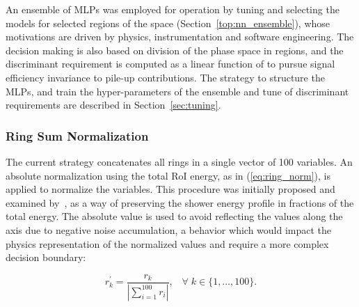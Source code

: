 An ensemble of MLPs was employed for operation by tuning and selecting
the models for selected regions of the \eteta space (Section~\ref{top:nn_ensemble}), whose
motivations are driven by physics, instrumentation and software 
engineering. The \rnn
decision making is also based on division of the phase space in regions, and the discriminant requirement is
computed as a linear function of \avgmu to pursue signal efficiency invariance
to pile-up contributions. 
The strategy to structure the MLPs,  and train the hyper-parameters of the ensemble and tune of discriminant requirements 
are described in Section~\ref{sec:tuning}.


%

\subsubsection{Ring Sum Normalization}\label{top:pp}

The current strategy concatenates all rings in a single vector of 100
variables. An absolute normalization using the total RoI energy, as in
(\ref{eq:ring_norm}), is applied to normalize the variables. This procedure was
initially proposed and examined by~\cite{1995_seixas_ringer}, as a way of
preserving the shower energy profile in fractions of the total energy. The
absolute value is used to avoid reflecting the values along the axis due to
negative noise accumulation, a behavior which would impact the physics
representation of the normalized values and require a more complex decision
boundary:

\begin{equation}
  r^\prime_{k} = \frac{r_{k}}{| \sum\limits_{i=1}^{100} r_i
  |}, \;\;\;
    \forall \; k\in\{1,\dots,100\}.
\label{eq:ring_norm}
\end{equation}

